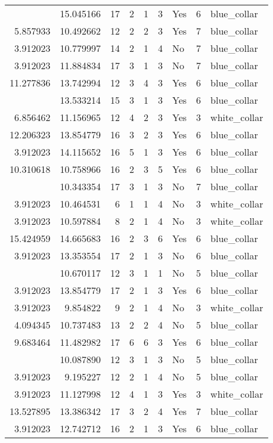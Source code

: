 \documentclass[
]{article}
\begin{document}
\begin{longtable}[t]{rrrrrllrl}
\addlinespace
3.912023 & 15.045166 & 17 & 2 & 1 & 3 & Yes & 6 & blue\_collar\\
5.857933 & 10.492662 & 12 & 2 & 2 & 3 & Yes & 7 & blue\_collar\\
3.912023 & 10.779997 & 14 & 2 & 1 & 4 & No & 7 & blue\_collar\\
3.912023 & 11.884834 & 17 & 3 & 1 & 3 & No & 7 & blue\_collar\\
11.277836 & 13.742994 & 12 & 3 & 4 & 3 & Yes & 6 & blue\_collar\\
\addlinespace
3.912023 & 13.533214 & 15 & 3 & 1 & 3 & Yes & 6 & blue\_collar\\
6.856462 & 11.156965 & 12 & 4 & 2 & 3 & Yes & 3 & white\_collar\\
12.206323 & 13.854779 & 16 & 3 & 2 & 3 & Yes & 6 & blue\_collar\\
3.912023 & 14.115652 & 16 & 5 & 1 & 3 & Yes & 6 & blue\_collar\\
10.310618 & 10.758966 & 16 & 2 & 3 & 5 & Yes & 6 & blue\_collar\\
\addlinespace
3.912023 & 10.343354 & 17 & 3 & 1 & 3 & No & 7 & blue\_collar\\
3.912023 & 10.464531 & 6 & 1 & 1 & 4 & No & 3 & white\_collar\\
3.912023 & 10.597884 & 8 & 2 & 1 & 4 & No & 3 & white\_collar\\
15.424959 & 14.665683 & 16 & 2 & 3 & 6 & Yes & 6 & blue\_collar\\
3.912023 & 13.353554 & 17 & 2 & 1 & 3 & No & 6 & blue\_collar\\
\addlinespace
3.912023 & 10.670117 & 12 & 3 & 1 & 1 & No & 5 & blue\_collar\\
3.912023 & 13.854779 & 17 & 2 & 1 & 3 & Yes & 6 & blue\_collar\\
3.912023 & 9.854822 & 9 & 2 & 1 & 4 & No & 3 & white\_collar\\
4.094345 & 10.737483 & 13 & 2 & 2 & 4 & No & 5 & blue\_collar\\
9.683464 & 11.482982 & 17 & 6 & 6 & 3 & Yes & 6 & blue\_collar\\
\addlinespace
3.912023 & 10.087890 & 12 & 3 & 1 & 3 & No & 5 & blue\_collar\\
3.912023 & 9.195227 & 12 & 2 & 1 & 4 & No & 5 & blue\_collar\\
3.912023 & 11.127998 & 12 & 4 & 1 & 3 & Yes & 3 & white\_collar\\
13.527895 & 13.386342 & 17 & 3 & 2 & 4 & Yes & 7 & blue\_collar\\
3.912023 & 12.742712 & 16 & 2 & 1 & 3 & Yes & 6 & blue\_collar\\

\end{longtable}
\end{document}
